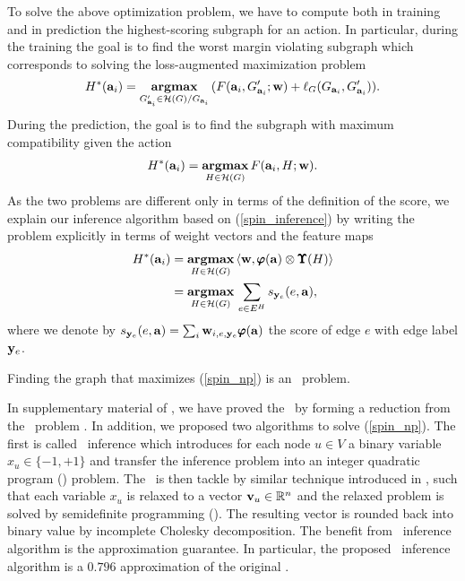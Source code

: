 {%
To solve the above optimization problem, we have to compute both in training and in prediction the highest-scoring subgraph for an action. 
In particular, during the training the goal is to find the worst margin violating subgraph which corresponds to solving the loss-augmented maximization problem
\begin{align*}
	H^*(\mathbf {a}_i) = \underset{G_{\mathbf {a}_i}'\in\mathcal{H}(G)/G_{\mathbf {a}_i}}{\textbf{argmax}}\, (F(\mathbf {a}_i,G_{\mathbf {a}_i}';\mathbf {w})+\mathbf {\ell}_{G}(G_{\mathbf {a}_i},G_{\mathbf {a}_i}')).
\end{align*}
During the prediction, the goal is to find the subgraph with maximum compatibility given the action
\begin{align}
	H^*(\mathbf {a}_i) = \underset{H\in\mathcal{H}(G)}{\textbf{argmax}}\, F(\mathbf {a}_i,H;\mathbf {w}) \label{spin_inference}.
\end{align}
As the two problems are different only in terms of the definition of the score, we explain our inference algorithm based on (\ref{spin_inference}) by writing the problem explicitly in terms of weight vectors and the feature maps
\begin{align}
	H^*(\mathbf {a}_i) &= \underset{H\in\mathcal{H}(G)}{\textbf{argmax}}\, \langle \mathbf {w}, \pmb \varphi(\mathbf {a})\otimes\pmb \Upsilon(H) \rangle \nonumber \\
	&= \underset{H\in\mathcal{H}(G)}{\textbf{argmax}}\, \sum_{e\in E^H}s_{\mathbf {y}_e}(e,\mathbf {a}), \label{spin_np}
\end{align}
where we denote by $s_{\mathbf {y}_e}(e,\mathbf {a}) = \sum_{i}\mathbf {w}_{i,e,\mathbf {y}_e}\pmb \varphi(\mathbf {a})$ the score of edge $e$ with edge label $\mathbf {y}_e$.

\begin{lemma}
	Finding the graph that maximizes (\ref{spin_np}) is an \nphard\ problem.
\end{lemma}
In supplementary material of , we have proved the \nphardness\ by forming a reduction from the \maxcut\ problem \citep{Garey90computers}.
In addition, we proposed two algorithms to solve (\ref{spin_np}).
The first is called {\sdp\ inference} which introduces for each node $u\in V$ a binary variable $x_u\in\{-1,+1\}$ and transfer the inference problem into an integer quadratic program (\iqp) problem.
The \iqp\ is then tackle by similar technique introduced in \citep{Geomans1995improved}, such that each variable $x_u$ is relaxed to a vector $\mathbf {v}_u\in\mathbb{R}^n$ and the relaxed problem is solved by semidefinite programming (\sdp). 
The resulting vector is rounded back into binary value by incomplete Cholesky decomposition.
The benefit from \sdp\ inference algorithm is the approximation guarantee. 
In particular, the proposed \sdp\ inference algorithm is a $0.796$ approximation of the original \iqp.

}
